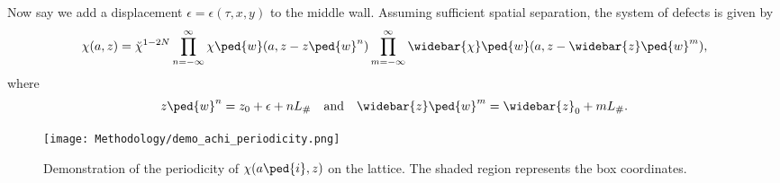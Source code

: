     Now say we add a displacement $\epsilon= \epsilon(\tau, x, y)$ to the middle wall. %
    Assuming sufficient spatial separation, the system of defects is given by
    \begin{equation}
        \chi(a,z) = \breve{\chi}^{1-2N}\prod_{n= -\infty}^\infty \chi\ped{w}(a, z- z\ped{w}^{n} )\prod_{m=-\infty}^{\infty} {\widebar{\chi}\ped{w}(a, z-\widebar{z}\ped{w}^m) },
    \end{equation}
    where
    \begin{equation}\label{eq:PT:gwas:wall_antiwall_positions}
        z\ped{w}^n = z_0 + \epsilon + nL_\# %
        \quad\text{and}\quad %
        \widebar{z}\ped{w}^m = \widebar{z}_0+ mL_\#.
    \end{equation}
    \begin{figure}[h]
        \centering
        \texttt{[image: Methodology/demo\_achi\_periodicity.png]}
        \caption{Demonstration of the periodicity of $\chi(a\ped{i},z)$ on the lattice. The shaded region represents the box coordinates.
        }\label{fig:PT:gwas:demo_achi_periodicity}
    \end{figure}
    
    



